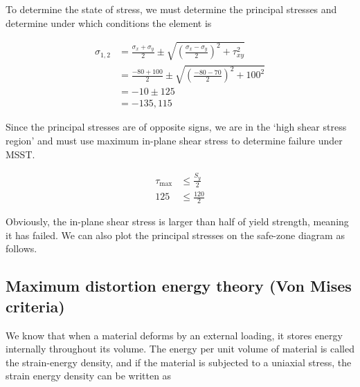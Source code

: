\documentclass[
10pt,
a4paper,
openany,
svgnames,
]{book}
\begin{document}
\begin{solution}
  To determine the state of stress, we must determine the principal stresses and determine under which conditions the element is

  \begin{align*}
    \sigma_{1,2} &= \frac{\sigma_x + \sigma_y}{2} \pm \sqrt{ \left( \frac{\sigma_x - \sigma_y}{2} \right)^2 + \tau_{xy}^2 } \\
                 &= \frac{-80 + 100}{2} \pm \sqrt{ \left( \frac{-80 - 70}{2} \right)^2 + 100^2 } \\
                 &= -10 \pm 125 \\
                 &= -135, 115
  \end{align*}

  Since the principal stresses are of opposite signs, we are in the `high shear stress region' and must use maximum in-plane shear stress to determine failure under MSST.

  \begin{align*}
    \tau_{\max} &\leqslant \frac{S_y}{2} \\
    125 &\leqslant \frac{120}{2}
  \end{align*}

  Obviously, the in-plane shear stress is larger than half of yield strength, meaning it has failed. We can also plot the principal stresses on the safe-zone diagram as follows.

  \begin{figure}[H]
    \centering
  \end{figure}
\end{solution}

\subsection{Maximum distortion energy theory (Von Mises criteria)}
\label{sub: mdet}

We know that when a material deforms by an external loading, it stores energy internally throughout its volume. The energy per unit volume of material is called the strain-energy density, and if the material is subjected to a uniaxial stress, the strain energy density can be written as
\end{document}
